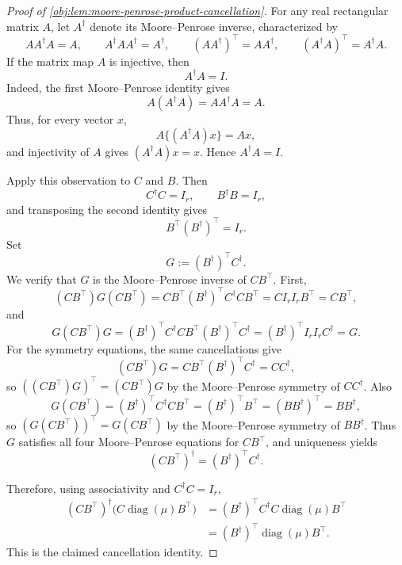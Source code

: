 \begin{proof}[Proof of \cref{obj:lem:moore-penrose-product-cancellation}]
For any real rectangular matrix \(A\), let \(A^\dagger\) denote its Moore--Penrose inverse, characterized by
\[
AA^\dagger A=A,\qquad
A^\dagger A A^\dagger=A^\dagger,\qquad
(AA^\dagger)^\top=AA^\dagger,\qquad
(A^\dagger A)^\top=A^\dagger A .
\]
If the matrix map \(A\) is injective, then
\[
A^\dagger A=I .
\]
Indeed, the first Moore--Penrose identity gives
\[
A(A^\dagger A)=AA^\dagger A=A.
\]
Thus, for every vector \(x\),
\[
A\{(A^\dagger A)x\}=Ax,
\]
and injectivity of \(A\) gives \((A^\dagger A)x=x\). Hence \(A^\dagger A=I\). %

Apply this observation to \(C\) and \(B\). Then
\[
C^\dagger C=I_r,\qquad B^\dagger B=I_r,
\]
and transposing the second identity gives
\[
B^\top (B^\dagger)^\top=I_r . %
\]
Set
\[
G:=(B^\dagger)^\top C^\dagger .
\]
We verify that \(G\) is the Moore--Penrose inverse of \(CB^\top\). First,
\[
(CB^\top)G(CB^\top)
=
CB^\top (B^\dagger)^\top C^\dagger C B^\top
=
C I_r I_r B^\top
=
CB^\top ,
\]
and
\[
G(CB^\top)G
=
(B^\dagger)^\top C^\dagger C B^\top (B^\dagger)^\top C^\dagger
=
(B^\dagger)^\top I_r I_r C^\dagger
=
G . %
\]
For the symmetry equations, the same cancellations give
\[
(CB^\top)G=CB^\top(B^\dagger)^\top C^\dagger=CC^\dagger,
\]
so \(((CB^\top)G)^\top=(CB^\top)G\) by the Moore--Penrose symmetry of \(CC^\dagger\). Also
\[
G(CB^\top)=(B^\dagger)^\top C^\dagger C B^\top=(B^\dagger)^\top B^\top=(BB^\dagger)^\top=BB^\dagger,
\]
so \((G(CB^\top))^\top=G(CB^\top)\) by the Moore--Penrose symmetry of \(BB^\dagger\). Thus \(G\) satisfies all four Moore--Penrose equations for \(CB^\top\), and uniqueness yields
\[
(CB^\top)^\dagger=(B^\dagger)^\top C^\dagger . %
\]

Therefore, using associativity and \(C^\dagger C=I_r\),
\[
\begin{aligned}
(CB^\top)^\dagger\bigl(C\operatorname{diag}(\mu)B^\top\bigr)
&=(B^\dagger)^\top C^\dagger C\operatorname{diag}(\mu)B^\top \\
&=(B^\dagger)^\top \operatorname{diag}(\mu)B^\top .
\end{aligned}
\]
This is the claimed cancellation identity. %
\end{proof}
